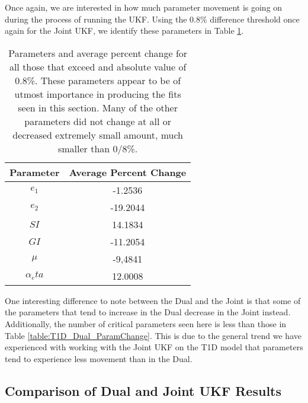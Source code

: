 \documentclass{article}
\begin{document}
Once again, we are interested in how much parameter movement is going on during the process of running the UKF.
Using the 0.8\% difference threshold once again for the Joint UKF, we identify these parameters in Table \ref{table:T1D_Joint_ParamChange}.


\begin{table}[H]
  \begin{center}
    \label{tab:table1}
    \begin{tabular}{c|c} %
      \textbf{Parameter} & \textbf{Average Percent Change} \\
      \hline
      \textbf{$e_1$} & -1.2536\\
      \textbf{$e_2$} & -19.2044\\
      \textbf{$SI$} & 14.1834\\
      \textbf{$GI$} & -11.2054\\
      \textbf{$\mu$} & -9,4841\\
      \textbf{$\alpha_eta$} & 12.0008\\
    \end{tabular}
    \caption{Parameters and average percent change for all those that exceed and absolute value of 0.8\%. These parameters appear to be of utmost importance in producing the fits seen in this section. Many of the other parameters did not change at all or decreased extremely small amount, much smaller than 0/8\%.}
    \label{table:T1D_Joint_ParamChange}
  \end{center}
\end{table}

One interesting difference to note between the Dual and the Joint is that some of the parameters that tend to increase in the Dual decrease in the Joint instead. Additionally, the number of critical parameters seen here is less than those in Table \ref{table:T1D_Dual_ParamChange}. This is due to the general trend we have experienced with working with the Joint UKF on the T1D model that parameters tend to experience less movement than in the Dual.


\subsection{Comparison of Dual and Joint UKF Results}
\end{document}

